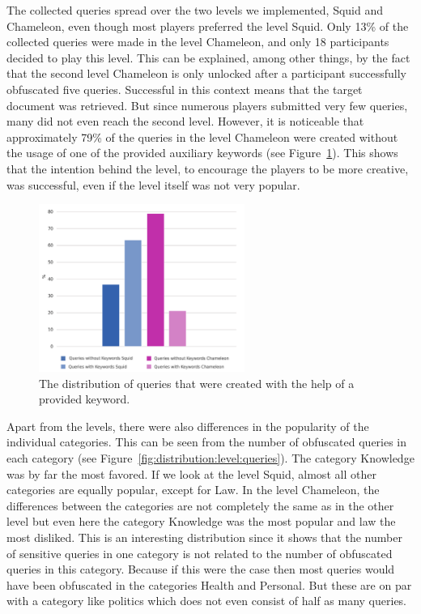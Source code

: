 The collected queries spread over the two levels we implemented, Squid and Chameleon, even though most players preferred the level Squid. Only 13\% of the collected queries were made in the level Chameleon, and only 18 participants decided to play this level. This can be explained, among other things, by the fact that the second level Chameleon is only unlocked after a participant successfully obfuscated five queries. Successful in this context means that the target document was retrieved. But since numerous players submitted very few queries, many did not even reach the second level.
However, it is noticeable that approximately 79\% of the queries in the level Chameleon were created without the usage of one of the provided auxiliary keywords (see Figure~\ref{fig:chameleon:intention}). This shows that the intention behind the level, to encourage the players to be more creative, was successful, even if the level itself was not very popular.\par
\begin{figure}[h]
    \centering
    \includegraphics[width=0.6\textwidth]{graphics/evaluation/query_used_keyword_test_success_chameleon_purpose.pdf}
    \caption{The distribution of queries that were created with the help of a provided keyword.}
    \label{fig:chameleon:intention}
\end{figure}
Apart from the levels, there were also differences in the popularity of the individual categories. This can be seen from the number of obfuscated queries in each category (see Figure~\ref{fig:distribution:level:queries}). The category Knowledge was by far the most favored. If we look at the level Squid, almost all other categories are equally popular, except for Law. In the level Chameleon, the differences between the categories are not completely the same as in the other level but even here the category Knowledge was the most popular and law the most disliked. This is an interesting distribution since it shows that the number of sensitive queries in one category is not related to the number of obfuscated queries in this category. Because if this were the case then most queries would have been obfuscated in the categories Health and Personal. But these are on par with a category like politics which does not even consist of half as many queries.\par
